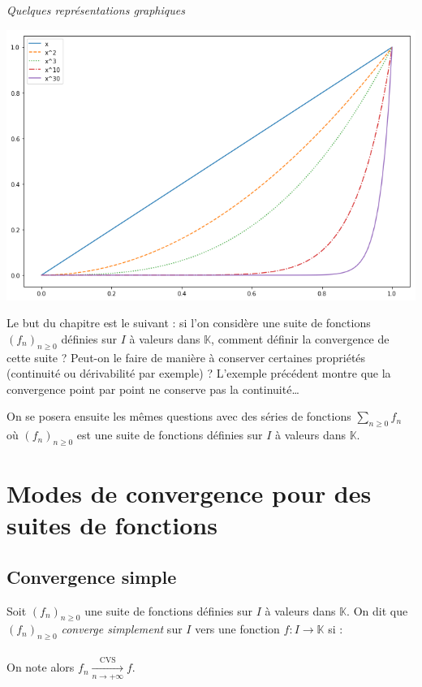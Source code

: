 \documentclass[french,11pt,twoside]{VcCours}
\newcommand{\Sum}[2]{\sum_{#1}^{#2}}
\begin{document}
\medskip

\begin{center}
\emph{Quelques représentations graphiques}
\end{center}

\begin{center}
\includegraphics[scale=0.4]{Chap6-intro.png}
\end{center}

\medskip

Le but du chapitre est le suivant : 
si l'on considère une suite de fonctions $(f_n)_{n \geq 0}$ définies sur $I$ 
à valeurs dans $\mathbb{K}$, comment définir la convergence de cette suite ? 
Peut-on le faire de manière à conserver certaines propriétés (continuité ou 
dérivabilité par exemple) ? L'exemple précédent montre que la convergence \og{}
point par point \fg{} ne conserve pas la continuité\ldots

\medskip

On se posera ensuite les mêmes questions avec des séries de fonctions $\Sum{n \geq 0}{} f_n$ où $(f_n)_{n \geq 0}$ est une suite de fonctions définies sur $I$ à valeurs dans $\mathbb{K}$.


\section{Modes de convergence pour des suites de fonctions}

\subsection{Convergence simple}

\begin{Definition}{} Soit $(f_n)_{n \geq 0}$ une suite de fonctions définies sur $I$ à valeurs dans $\mathbb{K}$. On dit que $(f_n)_{n \geq 0}$ \emph{converge simplement} sur $I$ vers une fonction $f : I \rightarrow \mathbb{K}$ si :
$$ \phantom{\forall x \in I, \quad \lim_{n \rightarrow + \infty} f_n(x) = f(x)} $$
On note alors $f_n \xrightarrow[n \rightarrow + \infty]{\textrm{CVS}} f$.
\end{Definition}
\end{document}
